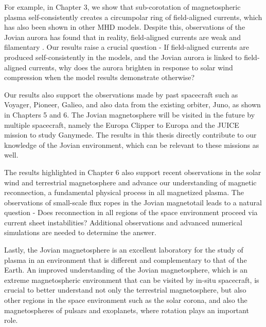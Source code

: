 For example, in Chapter 3, we show that sub-corotation of magnetospheric plasma self-consistently creates a circumpolar ring of field-aligned currents, which has also been shown in other MHD models. Despite this, observations of the Jovian aurora has found that in reality, field-aligned currents are weak and filamentary \cite{Kotsiaros2019BirkelandSpacecraft}. Our results raise a crucial question - If field-aligned currents are produced self-consistently in the models, and the Jovian aurora is linked to field-aligned currents, why does the aurora brighten in response to solar wind compression when the model results demonstrate otherwise? 

Our results also support the observations made by past spacecraft such as Voyager, Pioneer, Galieo, and also data from the existing orbiter, Juno, as shown in Chapters 5 and 6. The Jovian magnetosphere will be visited in the future by multiple spacecraft, namely the Europa Clipper to Europa and the JUICE mission to study Ganymede. The results in this thesis directly contribute to our knowledge of the Jovian environment, which can be relevant to these missions as well. 

The results highlighted in Chapter 6 also support recent observations in the solar wind and terrestrial magnetosphere and advance our understanding of magnetic reconnection, a fundamental physical process in all magnetized plasma. The observations of small-scale flux ropes in the Jovian magnetotail leads to a natural question - Does reconnection in all regions of the space environment proceed via current sheet instabilities? Additional observations and advanced numerical simulations are needed to determine the answer. 

Lastly, the Jovian magnetosphere is an excellent laboratory for the study of plasma in an environment that is different and complementary to that of the Earth. An improved understanding of the Jovian magnetosphere, which is an extreme magnetospheric environment that can be visited by in-situ spacecraft, is crucial to better understand not only the terrestrial magnetosphere, but also other regions in the space environment such as the solar corona, and also the magnetospheres of pulsars and exoplanets, where rotation plays an important role.